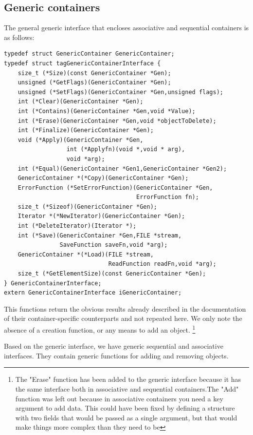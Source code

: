 \documentclass[12pt,a4paper,openany]{memoir} %
\begin{document}
{{\subsection{Generic containers}
The general generic interface that encloses associative and sequential containers is as follows:
\begin{verbatim}
typedef struct GenericContainer GenericContainer;
typedef struct tagGenericContainerInterface {
    size_t (*Size)(const GenericContainer *Gen);
    unsigned (*GetFlags)(GenericContainer *Gen);
    unsigned (*SetFlags)(GenericContainer *Gen,unsigned flags);
    int (*Clear)(GenericContainer *Gen);
    int (*Contains)(GenericContainer *Gen,void *Value);
    int (*Erase)(GenericContainer *Gen,void *objectToDelete);
    int (*Finalize)(GenericContainer *Gen);
    void (*Apply)(GenericContainer *Gen,
                  int (*Applyfn)(void *,void * arg),
                  void *arg);
    int (*Equal)(GenericContainer *Gen1,GenericContainer *Gen2);
    GenericContainer *(*Copy)(GenericContainer *Gen);
    ErrorFunction (*SetErrorFunction)(GenericContainer *Gen,
                                      ErrorFunction fn);
    size_t (*Sizeof)(GenericContainer *Gen);
    Iterator *(*NewIterator)(GenericContainer *Gen);
    int (*DeleteIterator)(Iterator *);
    int (*Save)(GenericContainer *Gen,FILE *stream, 
                SaveFunction saveFn,void *arg);
    GenericContainer *(*Load)(FILE *stream, 
                              ReadFunction readFn,void *arg);
    size_t (*GetElementSize)(const GenericContainer *Gen);
} GenericContainerInterface;
extern GenericContainerInterface iGenericContainer;
\end{verbatim}
This functions return the obvious results already described in the documentation of their container-specific counterparts and not repeated here. We only note the absence of a creation function, or any means to add an object.
\footnote{The "Erase" function  has been added to the generic interface because it has the same interface both in associative and sequential containers.The "Add" function was left out because in associative containers you need a key argument to add data. This could have been fixed by defining a structure with two fields that would be passed as a single argument, but that would make things more complex than they need to be}

Based on the generic interface, we have generic sequential and associative interfaces. They contain generic functions for adding and removing objects.
}}
\end{document}
